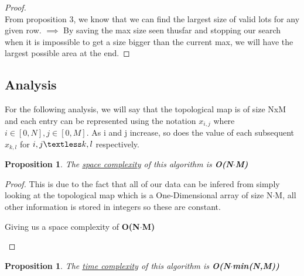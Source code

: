 \documentclass[12pt]{article}
\newtheorem{proposition}[theorem]{Proposition}
\begin{document}
\begin{proof}
~ \\ \indent From proposition 3, we know that we can find the largest size of valid lots for any given row. $\implies$
By saving the max size seen thusfar and stopping  our search when it is impossible to get a size bigger than the current
max, we will have the largest possible area at the end.
\end{proof}

\subsection{Analysis}
For the following analysis, we will say that the topological map is of size NxM and each entry
can be represented using the notation $x_{i,j}$ where $i \in [0,N], j \in [0,M]$. As i and j
increase, so does the value of each subsequent $x_{k,l}$ for $i,j \textless k,l$ respectively.

\begin{proposition}
\label{numq}
The \underline{space complexity} of this algorithm is \textbf{O(N$\cdot$M)}
\end{proposition}

\begin{proof}
This is due to the fact that all of our data can be infered from simply looking at the topological map which is a
One-Dimensional array of size N$\cdot$M, all other information is stored in integers so these are constant. \\
\begin{center}
    Giving us a space complexity of \textbf{O(N$\cdot$M)}
\end{center}
\end{proof}

\begin{proposition}
\label{numq}
The \underline{time complexity} of this algorithm is \textbf{O(N$\cdot$min(N,M))}
\end{proposition}
\end{document}
